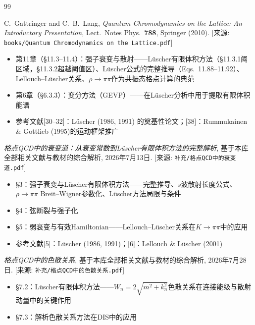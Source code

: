 \documentclass[12pt,a4paper]{ctexart}
\theoremstyle{definition}
\begin{document}

\begin{thebibliography}{99}

C.~Gattringer and C.~B.~Lang,
\textit{Quantum Chromodynamics on the Lattice: An Introductory Presentation},
Lect.\ Notes Phys.\ \textbf{788}, Springer (2010).
[来源: \texttt{books/Quantum Chromodynamics on the Lattice.pdf}]
\begin{itemize}
    \item 第11章（§11.3--11.4）：强子衰变与散射——L\"uscher有限体积方法（§11.3.1阈区域，§11.3.2超越阈值区）、L\"uscher公式的完整推导（Eqs.~11.88--11.92）、Lellouch--L\"uscher关系、$\rho\to\pi\pi$作为共振态格点计算的典范
    \item 第6章（§6.3.3）：变分方法（GEVP）——在L\"uscher分析中用于提取有限体积能谱
    \item 参考文献[30--32]：L\"uscher (1986, 1991) 的奠基性论文；[38]：Rummukainen \& Gottlieb (1995)的运动框架推广
\end{itemize}

\textit{格点QCD中的衰变道：从衰变常数到L\"uscher有限体积方法的完整解析},
基于本库全部相关文献与教材的综合解析, 2026年7月13日.
[来源: \texttt{补充/格点QCD中的衰变道.pdf}]
\begin{itemize}
    \item §3：强子衰变与L\"uscher有限体积方法——完整推导、$s$波散射长度公式、$\rho\to\pi\pi$ Breit--Wigner参数化、L\"uscher方法局限与条件
    \item §4：弦断裂与强子化
    \item §5：弱衰变与有效Hamiltonian——Lellouch--L\"uscher关系在$K\to\pi\pi$中的应用
    \item 参考文献[5]：L\"uscher (1986, 1991)；[6]：Lellouch \& L\"uscher (2001)
\end{itemize}

\textit{格点QCD中的色散关系},
基于本库全部相关文献与教材的综合解析, 2026年7月28日.
[来源: \texttt{补充/格点QCD中的色散关系.pdf}]
\begin{itemize}
    \item §7.2：L\"uscher有限体积方法——$W_n = 2\sqrt{m^2 + k_n^2}$色散关系在连接能级与散射动量中的关键作用
    \item §7.3：解析色散关系方法在DIS中的应用
\end{itemize}


\end{thebibliography}
\end{document}
